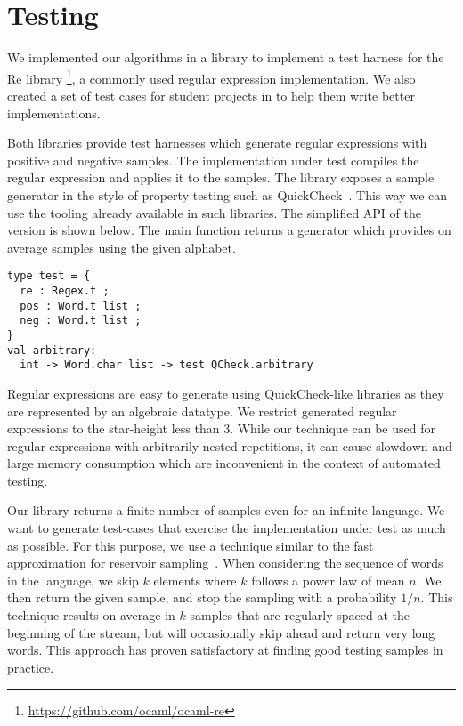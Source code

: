 \section{Testing}
\label{sec:test}

We implemented our algorithms in a library to implement a test harness for the \ocaml Re library%
\footnote{\url{https://github.com/ocaml/ocaml-re}},
a commonly used \ocaml regular expression implementation.
%
We also created a set of test cases for student projects in \haskell
to help them write better implementations.

Both libraries provide test harnesses which generate
regular expressions with positive and negative samples. The
implementation under test compiles the regular expression and applies it to the samples. 
The library exposes a sample generator in the style of
property testing such as QuickCheck~\cite{DBLP:conf/icfp/ClaessenH00}.
This way we can use the tooling already available in such libraries.
%
The simplified API of the \ocaml version is shown below.
The main function  returns a generator
which provides on average  samples using the given alphabet.

\begin{lstlisting}
type test = {
  re : Regex.t ;
  pos : Word.t list ;
  neg : Word.t list ;
}
val arbitrary:
  int -> Word.char list -> test QCheck.arbitrary
\end{lstlisting}

Regular expressions are easy to generate using QuickCheck-like
libraries as they are represented by an algebraic datatype.  We
restrict generated regular expressions to the star-height less than
3. While our technique can be used for regular expressions with
arbitrarily nested repetitions, it can cause slowdown and large memory
consumption which are inconvenient in the context of automated
testing.

Our library returns a finite number of samples even for an infinite language. We want to generate 
test-cases that exercise the implementation under test as much as
possible. For this purpose, we use a technique similar to the fast
approximation for reservoir
sampling~\citep{DBLP:journals/toms/Vitter87}.  When considering the
sequence of words in the language, we skip $k$ elements where $k$
follows a power law of mean $n$. We then return the given sample, and
stop the sampling with a probability $1/n$.
%
This technique results on average in $k$ samples that are regularly
spaced at the beginning of the stream, but will occasionally skip ahead
and return very long words. This approach has proven satisfactory at finding good
testing samples in practice.

